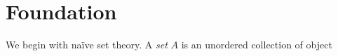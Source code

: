 
\chapter{Foundation}

We begin with na\"ive set theory. A \emph{set} $A$ is an unordered collection of object


